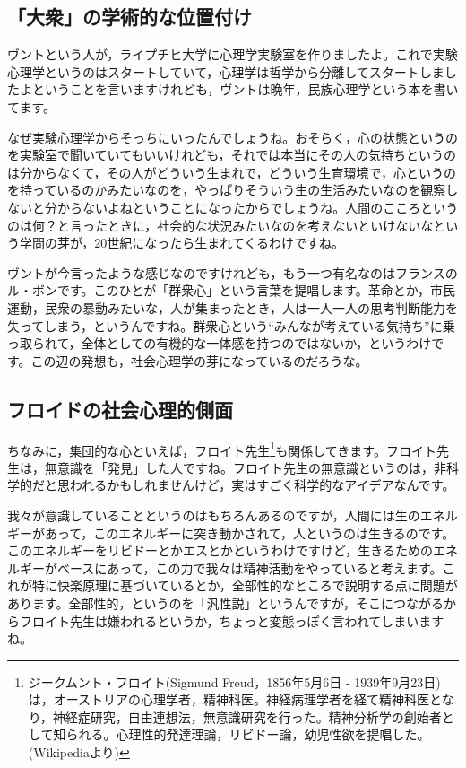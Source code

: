\documentclass{ltjsbook}
\begin{document}
\subsection{「大衆」の学術的な位置付け}
ヴントという人が，ライプチヒ大学に心理学実験室を作りましたよ。これで実験心理学というのはスタートしていて，心理学は哲学から分離してスタートしましたよということを言いますけれども，ヴントは晩年，民族心理学という本を書いてます。

なぜ実験心理学からそっちにいったんでしょうね。おそらく，心の状態というのを実験室で聞いていてもいいけれども，それでは本当にその人の気持ちというのは分からなくて，その人がどういう生まれで，どういう生育環境で，心というのを持っているのかみたいなのを，やっぱりそういう生の生活みたいなのを観察しないと分からないよねということになったからでしょうね。人間のこころというのは何？と言ったときに，社会的な状況みたいなのを考えないといけないなという学問の芽が，20世紀になったら生まれてくるわけですね。

ヴントが今言ったような感じなのですけれども，もう一つ有名なのはフランスのル・ボンです。このひとが「群衆心」という言葉を提唱します。革命とか，市民運動，民衆の暴動みたいな，人が集まったとき，人は一人一人の思考判断能力を失ってしまう，というんですね。群衆心という``みんなが考えている気持ち''に乗っ取られて，全体としての有機的な一体感を持つのではないか，というわけです。この辺の発想も，社会心理学の芽になっているのだろうな。

\subsection{フロイドの社会心理的側面}

ちなみに，集団的な心といえば，フロイト先生\footnote{ジークムント・フロイト(Sigmund Freud，1856年5月6日 - 1939年9月23日)は，オーストリアの心理学者，精神科医。神経病理学者を経て精神科医となり，神経症研究，自由連想法，無意識研究を行った。精神分析学の創始者として知られる。心理性的発達理論，リビドー論，幼児性欲を提唱した。(Wikipediaより)}も関係してきます。フロイト先生は，無意識を「発見」した人ですね。フロイト先生の無意識というのは，非科学的だと思われるかもしれませんけど，実はすごく科学的なアイデアなんです。

我々が意識していることというのはもちろんあるのですが，人間には生のエネルギーがあって，このエネルギーに突き動かされて，人というのは生きるのです。このエネルギーをリビドーとかエスとかというわけですけど，生きるためのエネルギーがベースにあって，この力で我々は精神活動をやっていると考えます。これが特に快楽原理に基づいているとか，全部性的なところで説明する点に問題があります。全部性的，というのを「汎性説」というんですが，そこにつながるからフロイト先生は嫌われるというか，ちょっと変態っぽく言われてしまいますね。
\end{document}
